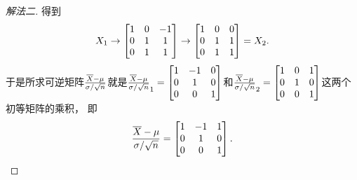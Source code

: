 \begin{example}
\begin{solution}
\begin{proof}[解法二]
得到\begin{equation*}
	X_1 \to \begin{bmatrix}
		1 & 0 & -1 \\
		0 & 1 & 1 \\
		0 & 1 & 1
	\end{bmatrix}
	\to \begin{bmatrix}
		1 & 0 & 0 \\
		0 & 1 & 1 \\
		0 & 1 & 1
	\end{bmatrix}
	= X_2.
\end{equation*}
于是所求可逆矩阵\(\P\)就是\(\P_1 = \begin{bmatrix}
	1 & -1 & 0 \\
	0 & 1 & 0 \\
	0 & 0 & 1
\end{bmatrix}\)和\(\P_2 = \begin{bmatrix}
	1 & 0 & 1 \\
	0 & 1 & 0 \\
	0 & 0 & 1
\end{bmatrix}\)这两个初等矩阵的乘积，
即\begin{equation*}
	\P = \begin{bmatrix}
		1 & -1 & 1 \\
		0 & 1 & 0 \\
		0 & 0 & 1
	\end{bmatrix}.
\end{equation*}
\end{proof}
\end{solution}
\end{example}
